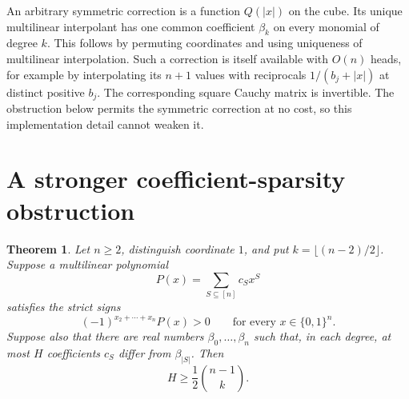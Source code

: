 \documentclass[11pt]{article}
\newtheorem{theorem}{Theorem}
\begin{document}
An arbitrary symmetric correction is a function $Q(|x|)$ on the cube.
Its unique multilinear interpolant has one common coefficient
$\beta_k$ on every monomial of degree $k$. This follows by permuting
coordinates and using uniqueness of multilinear interpolation. Such
a correction is itself available with $O(n)$ heads, for example by
interpolating its $n+1$ values with reciprocals $1/(b_j+|x|)$ at
distinct positive $b_j$. The corresponding square Cauchy matrix is
invertible. The obstruction below permits the symmetric correction
at no cost, so this implementation detail cannot weaken it.

\section{A stronger coefficient-sparsity obstruction}

\begin{theorem}\label{thm:sparse}
Let $n\ge2$, distinguish coordinate $1$, and put
$k=\lfloor(n-2)/2\rfloor$. Suppose a multilinear polynomial
\[
                         P(x)=\sum_{S\subseteq[n]}c_S x^S
\]
satisfies the strict signs
\[
              (-1)^{x_2+\cdots+x_n}P(x)>0
                    \qquad\text{for every }x\in\{0,1\}^n.       \tag{3}
\]
Suppose also that there are real numbers $\beta_0,\ldots,\beta_n$
such that, in each degree, at most $H$ coefficients $c_S$ differ from
$\beta_{|S|}$. Then
\[
                  H\ge\frac12\binom{n-1}{k}.                   \tag{4}
\]
\end{theorem}
\end{document}
